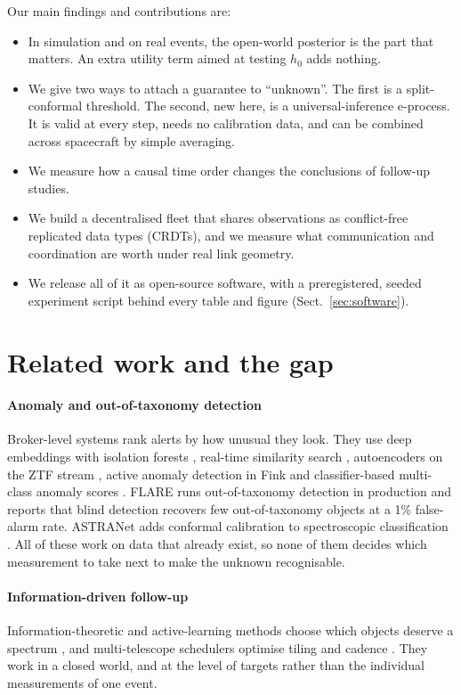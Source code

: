 \documentclass[final,5p,times,twocolumn,authoryear]{elsarticle}
\begin{document}
Our main findings and contributions are:
\begin{itemize}
\item In simulation and on real events, the open-world posterior is the part that matters. An extra utility term aimed at testing $h_0$ adds nothing.
\item We give two ways to attach a guarantee to ``unknown''. The first is a split-conformal threshold. The second, new here, is a universal-inference e-process. It is valid at every step, needs no calibration data, and can be combined across spacecraft by simple averaging.
\item We measure how a causal time order changes the conclusions of follow-up studies.
\item We build a decentralised fleet that shares observations as conflict-free replicated data types (CRDTs), and we measure what communication and coordination are worth under real link geometry.
\item We release all of it as open-source software, with a preregistered, seeded experiment script behind every table and figure (Sect.~\ref{sec:software}).
\end{itemize}

\section{Related work and the gap}\label{sec:related}

\paragraph{Anomaly and out-of-taxonomy detection} Broker-level systems rank alerts by how unusual they look. They use deep embeddings with isolation forests \citep{Villar2021}, real-time similarity search \citep{Aleo2024}, autoencoders on the ZTF stream \citep{Iskandarli2026}, active anomaly detection in Fink \citep{Pruzhinskaya2026} and classifier-based multi-class anomaly scores \citep{Gupta2024}. FLARE runs out-of-taxonomy detection in production \citep{Sasli2026FLARE} and reports that blind detection recovers few out-of-taxonomy objects at a 1\% false-alarm rate. ASTRANet adds conformal calibration to spectroscopic classification \citep{Sasli2026ASTRANet}. All of these work on data that already exist, so none of them decides which measurement to take next to make the unknown recognisable.

\paragraph{Information-driven follow-up} Information-theoretic and active-learning methods choose which objects deserve a spectrum \citep{Astudillo2020,Kennamer2020,Moller2025}, and multi-telescope schedulers optimise tiling and cadence \citep{Coughlin2019,Almualla2021}. They work in a closed world, and at the level of targets rather than the individual measurements of one event.
\end{document}
